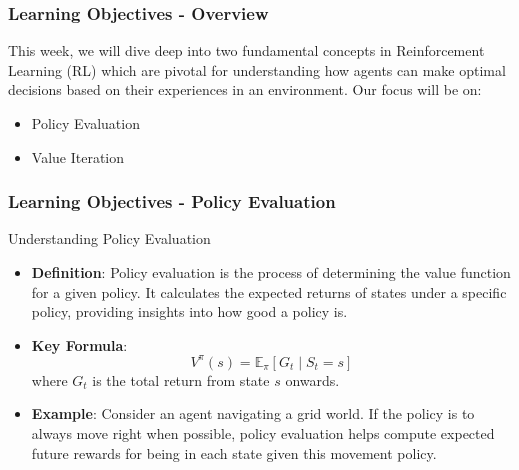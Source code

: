 \documentclass[aspectratio=169]{beamer}
\begin{document}
\begin{frame}[fragile]
    \frametitle{Learning Objectives - Overview}
    This week, we will dive deep into two fundamental concepts in Reinforcement Learning (RL) which are pivotal for understanding how agents can make optimal decisions based on their experiences in an environment. Our focus will be on:
    \begin{itemize}
        \item Policy Evaluation
        \item Value Iteration
    \end{itemize}
\end{frame}

\begin{frame}[fragile]
    \frametitle{Learning Objectives - Policy Evaluation}
    \begin{block}{Understanding Policy Evaluation}
        \begin{itemize}
            \item \textbf{Definition}: Policy evaluation is the process of determining the value function for a given policy. It calculates the expected returns of states under a specific policy, providing insights into how good a policy is.
            \item \textbf{Key Formula}:
            \begin{equation}
                V^{\pi}(s) = \mathbb{E}_{\pi} \left[ G_t \mid S_t = s \right]
            \end{equation}
            where \( G_t \) is the total return from state \( s \) onwards.
            \item \textbf{Example}: Consider an agent navigating a grid world. If the policy is to always move right when possible, policy evaluation helps compute expected future rewards for being in each state given this movement policy.
        \end{itemize}
    \end{block}
\end{frame}
\end{document}
